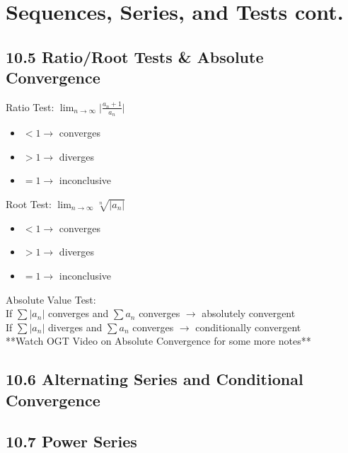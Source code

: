 \documentclass{article}
\begin{document}
    \section{Sequences, Series, and Tests cont.}
        \color{Emerald}
        \subsection*{10.5 Ratio/Root Tests \& Absolute Convergence}
            Ratio Test: $\lim_{n\to\infty} \lvert \frac{a_{n} + 1}{a_{n}} \rvert$ \\
            \begin{itemize}
                \item $< 1 \rightarrow$ converges \\
                \item $> 1 \rightarrow$ diverges \\
                \item $= 1 \rightarrow$ inconclusive \\
            \end{itemize}
            Root Test: $\lim_{n\to\infty} \sqrt[n]{\lvert a_{n} \rvert}$ \\
            \begin{itemize}
                \item $< 1 \rightarrow$ converges \\
                \item $> 1 \rightarrow$ diverges \\
                \item $= 1 \rightarrow$ inconclusive \\
            \end{itemize}
            Absolute Value Test: \\
            If $\sum \lvert a_{n} \rvert$ converges and $\sum a_{n}$ converges $\rightarrow$ absolutely convergent \\
            If $\sum \lvert a_{n} \rvert$ diverges and $\sum a_{n}$ converges $\rightarrow$ conditionally convergent \\
            **Watch OGT Video on Absolute Convergence for some more notes** \\
        \color{Black}
        \subsection*{10.6 Alternating Series and Conditional Convergence}
        \subsection*{10.7 Power Series}
\end{document}
